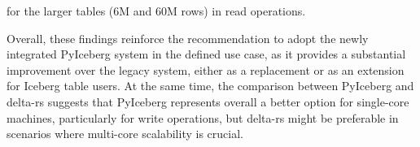 for the larger tables (6M and 60M rows) in read operations.

Overall, these findings reinforce the recommendation to adopt the newly integrated PyIceberg system in the defined use case, as it provides a substantial improvement over the legacy system, either as a replacement or as an extension for Iceberg table users. At the same time, the comparison between PyIceberg and delta-rs suggests that PyIceberg represents overall a better option for single-core machines, particularly for write operations, but delta-rs might be preferable in scenarios where multi-core scalability is crucial.